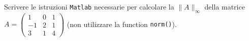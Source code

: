 Scrivere le istruzioni {\tt Matlab} necessarie per calcolare la  $\|A\|_{\infty}$ della matrice $A = \left( \begin{array}{ccc} 1 & 0 & 1 \\ -1 & 2 & 1 \\ 3 & 1 & 4 \end{array} \right)$ (non utilizzare la function {\tt norm()}).


